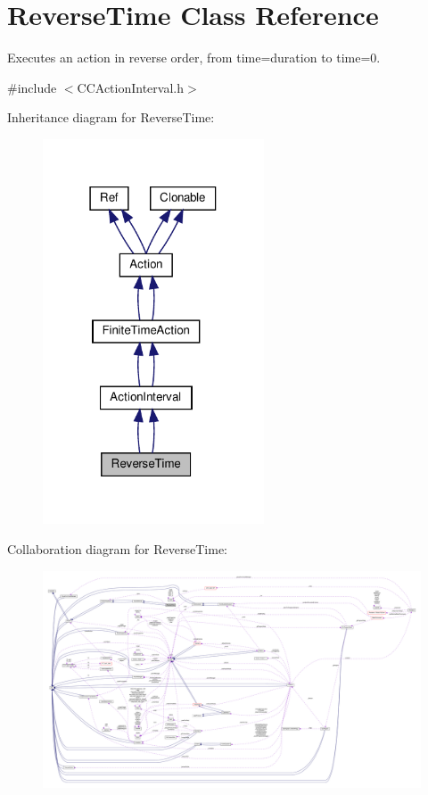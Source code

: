 \hypertarget{classReverseTime}{}\section{Reverse\+Time Class Reference}
\label{classReverseTime}


Executes an action in reverse order, from time=duration to time=0.  




{\ttfamily \#include $<$C\+C\+Action\+Interval.\+h$>$}



Inheritance diagram for Reverse\+Time\+:
\nopagebreak
\begin{figure}[H]
\begin{center}
\leavevmode
\includegraphics[width=186pt]{classReverseTime__inherit__graph}
\end{center}
\end{figure}


Collaboration diagram for Reverse\+Time\+:
\nopagebreak
\begin{figure}[H]
\begin{center}
\leavevmode
\includegraphics[width=350pt]{classReverseTime__coll__graph}
\end{center}
\end{figure}
